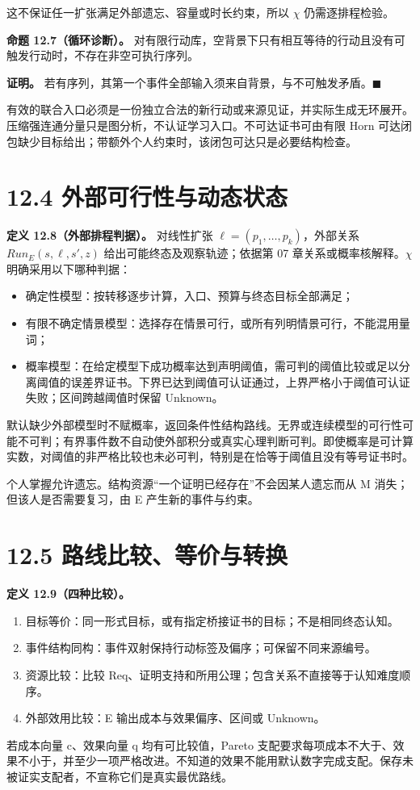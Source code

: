 \documentclass[UTF8,a4paper,zihao=-4,fontset=windows,openany]{ctexbook}
\def\mathrm#1{#1}%
\begin{document}
这不保证任一扩张满足外部遗忘、容量或时长约束，所以 \(\chi\) 仍需逐排程检验。

\textbf{命题 12.7（循环诊断）。} 对有限行动库，空背景下只有相互等待的行动且没有可触发行动时，不存在非空可执行序列。

\textbf{证明。} 若有序列，其第一个事件全部输入须来自背景，与不可触发矛盾。\(\blacksquare\)

有效的联合入口必须是一份独立合法的新行动或来源见证，并实际生成无环展开。压缩强连通分量只是图分析，不认证学习入口。不可达证书可由有限 Horn 可达闭包缺少目标给出；带额外个人约束时，该闭包可达只是必要结构检查。

\section{12.4 外部可行性与动态状态}
\textbf{定义 12.8（外部排程判据）。} 对线性扩张 \(\ell=(p_{1},\ldots,p_k)\)，外部关系 \(\mathrm{Run}_E(s,\ell,s',z)\) 给出可能终态及观察轨迹；依据第 07 章关系或概率核解释。\(\chi\) 明确采用以下哪种判据：

\begin{itemize}
\item 确定性模型：按转移逐步计算，入口、预算与终态目标全部满足；
\item 有限不确定情景模型：选择存在情景可行，或所有列明情景可行，不能混用量词；
\item 概率模型：在给定模型下成功概率达到声明阈值，需可判的阈值比较或足以分离阈值的误差界证书。下界已达到阈值可认证通过，上界严格小于阈值可认证失败；区间跨越阈值时保留 Unknown。
\end{itemize}
默认缺少外部模型时不赋概率，返回条件性结构路线。无界或连续模型的可行性可能不可判；有界事件数不自动使外部积分或真实心理判断可判。即使概率是可计算实数，对阈值的非严格比较也未必可判，特别是在恰等于阈值且没有等号证书时。

个人掌握允许遗忘。结构资源“一个证明已经存在”不会因某人遗忘而从 M 消失；但该人是否需要复习，由 E 产生新的事件与约束。

\section{12.5 路线比较、等价与转换}
\textbf{定义 12.9（四种比较）。}

\begin{enumerate}
\item 目标等价：同一形式目标，或有指定桥接证书的目标；不是相同终态认知。
\item 事件结构同构：事件双射保持行动标签及偏序；可保留不同来源编号。
\item 资源比较：比较 Req、证明支持和所用公理；包含关系不直接等于认知难度顺序。
\item 外部效用比较：E 输出成本与效果偏序、区间或 Unknown。
\end{enumerate}
若成本向量 c、效果向量 q 均有可比较值，Pareto 支配要求每项成本不大于、效果不小于，并至少一项严格改进。不知道的效果不能用默认数字完成支配。保存未被证实支配者，不宣称它们是真实最优路线。
\end{document}
